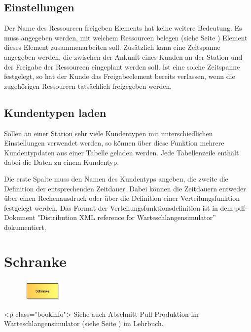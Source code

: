 \subsection*{Einstellungen}

Der Name des Ressourcen freigeben Elements hat keine weitere Bedeutung. Es muss angegeben werden, mit welchem
Ressourcen belegen (siehe Seite \pageref{ref:ModelElementSeize}) Element dieses Element zusammenarbeiten soll.
Zusätzlich kann eine Zeitspanne angegeben werden, die zwischen der Ankunft eines Kunden an der Station und
der Freigabe der Ressourcen eingeplant werden soll. Ist eine solche Zeitspanne festgelegt, so hat der Kunde
das Freigabeelement bereits verlassen, wenn die zugehörigen Ressourcen tatsächlich freigegeben werden.  

\subsection*{Kundentypen laden}

Sollen an einer Station sehr viele Kundentypen mit unterschiedlichen Einstellungen verwendet werden, so können über diese Funktion mehrere Kundentypdaten aus einer Tabelle geladen werden. Jede Tabellenzeile enthält dabei die Daten zu einem Kundentyp.

Die erste Spalte muss den Namen des Kundentyps angeben, die zweite die Definition der entsprechenden Zeitdauer.
Dabei können die Zeitdauern entweder über einen Rechenausdruck oder über die Definition einer
Verteilungsfunktion festgelegt werden. Das Format der Verteilungsfunktionsdefinition ist in dem pdf-Dokument
"Distribution XML reference for Warteschlangensimulator'' dokumentiert.


\section{Schranke}
\label{ref:ModelElementBarrier}

\begin{figure}
\vspace{-22pt}
\includegraphics[width=2cm]{imageModelElementBarrier.png}
\vspace{-22pt}
\end{figure}

<p class="bookinfo">
Siehe auch Abschnitt Pull-Produktion im Warteschlangensimulator (siehe Seite \pageref{ref:book:7.6.3}) im Lehrbuch.

